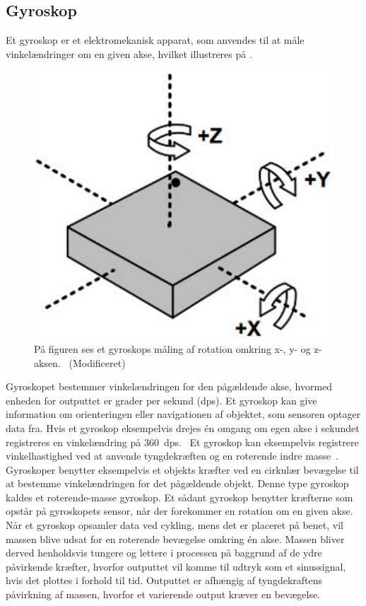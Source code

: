 \subsection{Gyroskop}
Et gyroskop er et elektromekanisk apparat, som anvendes til at måle vinkelændringer om en given akse, hvilket illustreres på . 
\begin{figure}[H]
	\centering
	\includegraphics[scale=0.4]{figures/bProblemloesning/gyro.png}
	\caption{På figuren ses et gyroskops måling af rotation omkring x-, y- og z-aksen.~\citep{Sparkfun_gyro} (Modificeret)}
	\label{fig:gyro}
\end{figure}\vspace{-.25cm}
Gyroskopet bestemmer vinkelændringen for den pågældende akse, hvormed enheden for outputtet er grader per sekund (dps). Et gyroskop kan give information om orienteringen eller navigationen af objektet, som sensoren optager data fra. Hvis et gyroskop eksempelvis drejes én omgang om egen akse i sekundet registreres en vinkelændring på 360~dps.~\citep{Sparkfun_gyro,Barbour2014} \newline
Et gyroskop kan eksempelvis registrere vinkelhastighed ved at anvende tyngdekræften og en roterende indre masse~\citep{Sparkfun_gyro,Barbour2014}.\\
Gyroskoper benytter eksempelvis et objekts kræfter ved en cirkulær bevægelse til at bestemme vinkelændringen for det pågældende objekt. Denne type gyroskop kaldes et roterende-masse gyroskop. Et sådant gyroskop benytter kræfterne som opstår på gyroskopets sensor, når der forekommer en rotation om en given akse. Når et gyroskop opsamler data ved cykling, mens det er placeret på benet, vil massen blive udsat for en roterende bevægelse omkring én akse. Massen bliver derved henholdsvis tungere og lettere i processen på baggrund af de ydre påvirkende kræfter, hvorfor outputtet vil komme til udtryk som et sinussignal, hvis det plottes i forhold til tid. Outputtet er afhængig af tyngdekraftens påvirkning af massen, hvorfor et varierende output kræver en bevægelse.~\citep{TittertonWeston2004,Barbour2014,LuingeVeltink2005}

